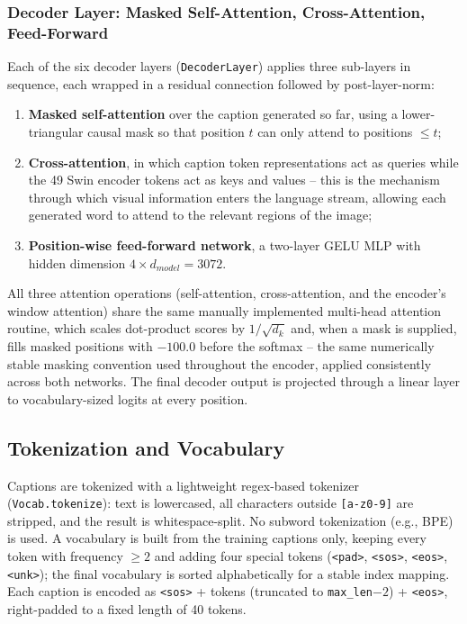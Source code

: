 \subsubsection{Decoder Layer: Masked Self-Attention, Cross-Attention, Feed-Forward}
Each of the six decoder layers (\texttt{DecoderLayer}) applies three sub-layers in sequence, each wrapped in a residual connection followed by post-layer-norm:
\begin{enumerate}
    \item \textbf{Masked self-attention} over the caption generated so far, using a lower-triangular causal mask so that position $t$ can only attend to positions $\le t$;
    \item \textbf{Cross-attention}, in which caption token representations act as queries while the 49 Swin encoder tokens act as keys and values -- this is the mechanism through which visual information enters the language stream, allowing each generated word to attend to the relevant regions of the image;
    \item \textbf{Position-wise feed-forward network}, a two-layer GELU MLP with hidden dimension $4\times d_{model}=3072$.
\end{enumerate}
All three attention operations (self-attention, cross-attention, and the encoder's window attention) share the same manually implemented multi-head attention routine, which scales dot-product scores by $1/\sqrt{d_k}$ and, when a mask is supplied, fills masked positions with $-100.0$ before the softmax -- the same numerically stable masking convention used throughout the encoder, applied consistently across both networks. The final decoder output is projected through a linear layer to vocabulary-sized logits at every position.

\subsection{Tokenization and Vocabulary}
\label{sec:method-vocab}

Captions are tokenized with a lightweight regex-based tokenizer (\texttt{Vocab.tokenize}): text is lowercased, all characters outside \texttt{[a-z0-9]} are stripped, and the result is whitespace-split. No subword tokenization (e.g., BPE) is used. A vocabulary is built from the training captions only, keeping every token with frequency $\ge 2$ and adding four special tokens (\texttt{<pad>}, \texttt{<sos>}, \texttt{<eos>}, \texttt{<unk>}); the final vocabulary is sorted alphabetically for a stable index mapping. Each caption is encoded as \texttt{<sos>} + tokens (truncated to \texttt{max\_len}$-2$) + \texttt{<eos>}, right-padded to a fixed length of 40 tokens.

